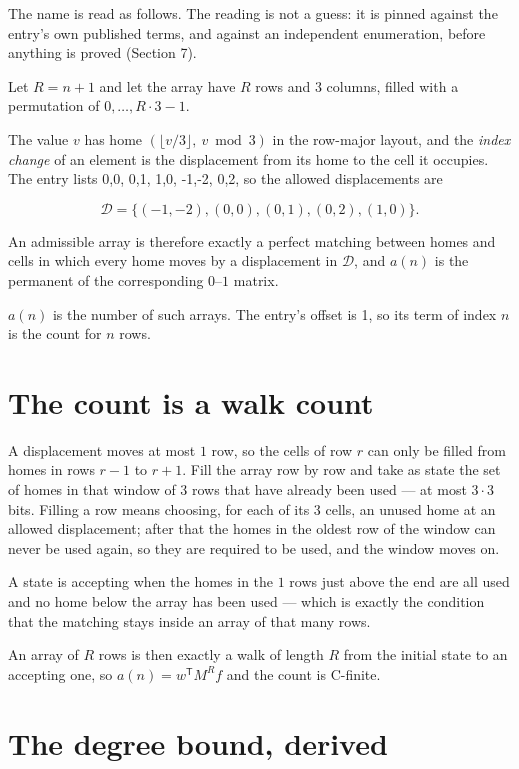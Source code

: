 \documentclass[11pt]{article}
\theoremstyle{definition}
\begin{document}
The name is read as follows. The reading is not a guess: it is pinned against the entry's own published terms, and against an independent enumeration, before anything is proved (Section 7).

Let $R = n + 1$ and let the array have $R$ rows and $3$ columns, filled with a permutation of $0,\dots,R\cdot3-1$.

The value $v$ has home $(\lfloor v/3\rfloor,\ v \bmod 3)$ in the row-major layout, and the {\itshape index change} of an element is the displacement from its home to the cell it occupies. The entry lists 0,0, 0,1, 1,0, -1,-2, 0,2, so the allowed displacements are

\[\mathcal{D} = \{(-1,-2), (0,0), (0,1), (0,2), (1,0)\}.\]

An admissible array is therefore exactly a perfect matching between homes and cells in which every home moves by a displacement in $\mathcal{D}$, and $a(n)$ is the permanent of the corresponding $0$--$1$ matrix.

$a(n)$ is the number of such arrays. The entry's offset is 1, so its term of index $n$ is the count for $n$ rows.

\section{The count is a walk count}

A displacement moves at most $1$ row, so the cells of row $r$ can only be filled from homes in rows $r-1$ to $r+1$. Fill the array row by row and take as state the set of homes in that window of $3$ rows that have already been used --- at most $3\cdot3$ bits. Filling a row means choosing, for each of its $3$ cells, an unused home at an allowed displacement; after that the homes in the oldest row of the window can never be used again, so they are required to be used, and the window moves on.

A state is accepting when the homes in the $1$ rows just above the end are all used and no home below the array has been used --- which is exactly the condition that the matching stays inside an array of that many rows.

An array of $R$ rows is then exactly a walk of length $R$ from the initial state to an accepting one, so $a(n) = w^{\mathsf T}M^{R}f$ and the count is C-finite.

\section{The degree bound, derived}
\end{document}
